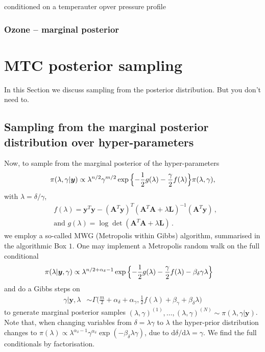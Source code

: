 conditioned on a temperauter opver pressure profile
\subsubsection{Ozone -- marginal posterior}
\section{MTC posterior sampling}
\label{sec:postsamp}
In this Section we discuss sampling from the posterior distribution. But you don't need to.
\subsection{Sampling from the marginal posterior distribution over hyper-parameters}
Now, to sample from the marginal posterior of the hyper-parameters
\begin{align}
	\pi(\lambda, \gamma | \bm{y})
	\propto  \lambda^{n/2} \gamma^{m/2}   \exp{ \Bigl\{ - \frac{1}{2} g ( \lambda) - \frac{\gamma}{2} f ( \lambda) \Bigr\} } \pi(\lambda, \gamma),
	\label{eq:MargPostAppl}
\end{align}
with $\lambda = \delta / \gamma$,
\begin{subequations}
	\label{eq:fandg}
	\begin{align}
		&f ( \lambda) = \bm{y}^T \bm{y} - (\bm{A}^T \bm{y})^T (\bm{A}^T  \bm{A} + \lambda \bm{L})^{-1} (\bm{A}^T \bm{y})  \, ,  \\
		&\text{and } g(\lambda) = \log \det (\bm{A}^T  \bm{A} + \lambda \bm{L}) \,.
	\end{align}
\end{subequations}
we employ a so-called MWG (Metropolis within Gibbs) algorithm, summarised in the algorithmic Box $1$.
One may implement a Metropolis random walk on the full conditional
\begin{align}
	\label{eq:lamCondPrior}
	\pi(\lambda | \bm{y}, \gamma) &\propto \lambda^{n/2+\alpha_\delta -1} \exp{\Bigl\{ - \frac{1}{2} g ( \lambda) - \frac{\gamma}{2} f ( \lambda) - \beta_\delta \gamma \lambda \Bigr\}} 
\end{align} 
and do a Gibbs steps on
\begin{align}
	\gamma |  \bm{y}, \lambda &\sim \Gamma \bigg( \frac{m}{2} + \alpha_\delta + \alpha_\gamma, \frac{1}{2} f (\lambda ) + \beta_\gamma + \beta_\delta \lambda \bigg)\label{eq:gamCondPrior}
\end{align} 
to generate marginal posterior samples $(\lambda, \gamma)^{(1)}, \dots, (\lambda, \gamma)^{(N)} \sim  \pi(\lambda, \gamma| \bm{y})$.
Note that, when changing variables from $\delta = \lambda \gamma$ to $\lambda$ the hyper-prior distribution changes to $\pi(\lambda) \propto \lambda^{\alpha_\delta-1} \gamma^{\alpha_\delta} \exp{(- \beta_\delta \lambda  \gamma)} $, due to $\text{d}\delta / \text{d} \lambda = \gamma$.
We find the full conditionals by factorisation.



